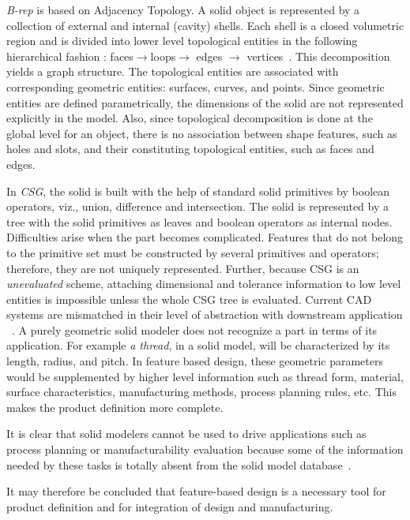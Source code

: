     {\em B-rep } is based on Adjacency Topology.
    A solid object is represented by a collection of external and
    internal (cavity) shells. Each shell is a closed volumetric region and
    is divided into lower level topological entities in the following 
	hierarchical fashion : faces$\rightarrow$loops$\rightarrow$ edges
	$\rightarrow$ vertices~\cite{Bing}.  This decomposition yields
    a graph structure. The topological entities are associated with
    corresponding geometric entities: surfaces, curves, and points. Since
    geometric entities are defined parametrically, the dimensions of the solid
    are not represented explicitly in the model. Also, since topological
    decomposition is done at the global level for an object, there is no
    association between shape features, such as holes and slots, and their
    constituting topological entities, such as faces and edges.


    In {\em CSG}, the solid is built with the help of standard solid primitives
 	by boolean operators, viz., union, difference and intersection.
    The solid is represented by a tree with the solid primitives as leaves and
    boolean operators as internal nodes. Difficulties arise when the part 
	becomes complicated. Features that do not belong to the primitive
	set must be constructed by several primitives and operators; therefore,
	they are not uniquely represented. Further, because CSG
	is an {\em unevaluated} scheme, attaching dimensional and tolerance 
	information to low level entities is impossible unless the whole CSG tree
	is evaluated. Current CAD systems are
    mismatched in their level of abstraction with downstream application
	~\cite{Sheu}.
    A purely geometric solid modeler does not recognize a part in terms of its
    application. For example {\em a thread}, in a solid model, will be
    characterized by its length, radius, and pitch. In
    feature based design, these geometric parameters would be supplemented by
    higher level information such as thread form, material, surface
    characteristics, manufacturing methods, process
    planning rules, etc. This makes the product definition more
    complete.

    It is clear that solid modelers cannot be used to drive applications
    such as process planning or manufacturability evaluation because some
    of the information needed by these tasks is totally absent from the
    solid model database~\cite{ShahMa}.

    It may therefore be concluded that feature-based design is a necessary
    tool for product definition and for integration of design and
    manufacturing.

